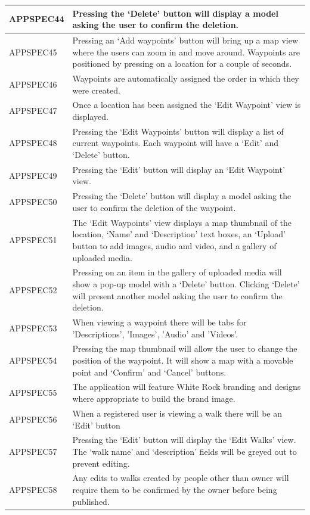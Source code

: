 \documentclass[11pt,a4paper]{article}
\begin{document}
\begin{longtable}{|p{2.5cm}p{13cm}|}
APPSPEC44 & Pressing the `Delete' button will display a model asking the user to confirm the deletion. \\ \hline
APPSPEC45 & Pressing an `Add waypoints' button will bring up a map view where the users can zoom in and move around. Waypoints are positioned by pressing on a location for a couple of seconds. \\ \hline
APPSPEC46 & Waypoints are automatically assigned the order in which they were created. \\ \hline
APPSPEC47 & Once a location has been assigned the `Edit Waypoint' view is displayed.\\ \hline
APPSPEC48 & Pressing the `Edit Waypoints' button will display a list of current waypoints. Each waypoint will have a `Edit' and `Delete' button. \\ \hline
APPSPEC49 & Pressing the `Edit' button will display an `Edit Waypoint' view. \\ \hline
APPSPEC50 & Pressing the `Delete' button will display a model asking the user to confirm the deletion of the waypoint. \\ \hline
APPSPEC51 & The `Edit Waypoints' view displays a map thumbnail of the location, `Name' and `Description' text boxes, an `Upload' button to add images, audio and video, and a gallery of uploaded media. \\ \hline
APPSPEC52 & Pressing on an item in the gallery of uploaded media will show a pop-up model with a `Delete' button. Clicking `Delete' will present another model asking the user to confirm the deletion. \\ \hline
APPSPEC53 & When viewing a waypoint there will be tabs for 'Descriptions', 'Images', 'Audio' and 'Videos'. \\ \hline
APPSPEC54 & Pressing the map thumbnail will allow the user to change the position of the waypoint. It will show a map with a movable point and `Confirm' and `Cancel' buttons. \\ \hline
APPSPEC55 & The application will feature White Rock branding and designs where appropriate to build the brand image. \\ \hline
APPSPEC56 & When a registered user is viewing a walk there will be an `Edit' button \\ \hline
APPSPEC57 & Pressing the `Edit' button will display the `Edit Walks' view. The `walk name' and `description' fields will be greyed out to prevent editing.\\ \hline
APPSPEC58 & Any edits to walks created by people other than owner will require them to be confirmed by the owner before being published. \\ \hline

\end{longtable}
\end{document}
